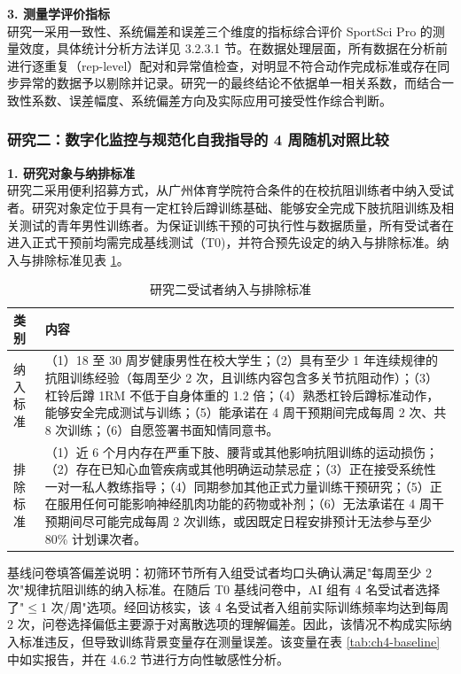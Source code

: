 \documentclass[UTF8,zihao=-4,twoside,openany]{ctexbook}
\begin{document}
\vspace{0.2cm}
\noindent \textbf{3. 测量学评价指标} \\
研究一采用一致性、系统偏差和误差三个维度的指标综合评价 SportSci Pro 的测量效度，具体统计分析方法详见 3.2.3.1 节。在数据处理层面，所有数据在分析前进行逐重复（rep-level）配对和异常值检查，对明显不符合动作完成标准或存在同步异常的数据予以剔除并记录。研究一的最终结论不依据单一相关系数，而结合一致性系数、误差幅度、系统偏差方向及实际应用可接受性作综合判断。

\subsubsection{研究二：数字化监控与规范化自我指导的 4 周随机对照比较}
\noindent \textbf{1. 研究对象与纳排标准} \\
研究二采用便利招募方式，从广州体育学院符合条件的在校抗阻训练者中纳入受试者。研究对象定位于具有一定杠铃后蹲训练基础、能够安全完成下肢抗阻训练及相关测试的青年男性训练者。为保证训练干预的可执行性与数据质量，所有受试者在进入正式干预前均需完成基线测试（T0)，并符合预先设定的纳入与排除标准。纳入与排除标准见表 \ref{tab:ch3-inclusion}。

\begin{table}[htbp]
  \centering
  \caption{研究二受试者纳入与排除标准}
  \label{tab:ch3-inclusion}
  \vspace{6pt}
  \small
  \begin{tabularx}{\textwidth}{|m{2.2cm}|X|}
    \hline
    \textbf{类别} & \textbf{内容} \\ \hline
    纳入标准 & （1）18 至 30 周岁健康男性在校大学生；（2）具有至少 1 年连续规律的抗阻训练经验（每周至少 2 次，且训练内容包含多关节抗阻动作）；（3）杠铃后蹲 1RM 不低于自身体重的 1.2 倍；（4）熟悉杠铃后蹲标准动作，能够安全完成测试与训练；（5）能承诺在 4 周干预期间完成每周 2 次、共 8 次训练；（6）自愿签署书面知情同意书。 \\ \hline
    排除标准 & （1）近 6 个月内存在严重下肢、腰背或其他影响抗阻训练的运动损伤；（2）存在已知心血管疾病或其他明确运动禁忌症；（3）正在接受系统性一对一私人教练指导；（4）同期参加其他正式力量训练干预研究；（5）正在服用任何可能影响神经肌肉功能的药物或补剂；（6）无法承诺在 4 周干预期间尽可能完成每周 2 次训练，或因既定日程安排预计无法参与至少 80\% 计划课次者。 \\ \hline
  \end{tabularx}
\end{table}

基线问卷填答偏差说明：初筛环节所有入组受试者均口头确认满足"每周至少 2 次"规律抗阻训练的纳入标准。在随后 T0 基线问卷中，AI 组有 4 名受试者选择了"$\le$1 次/周"选项。经回访核实，该 4 名受试者入组前实际训练频率均达到每周 2 次，问卷选择偏低主要源于对离散选项的理解偏差。因此，该情况不构成实际纳入标准违反，但导致训练背景变量存在测量误差。该变量在表 \ref{tab:ch4-baseline} 中如实报告，并在 4.6.2 节进行方向性敏感性分析。
\end{document}

